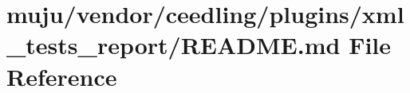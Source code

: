 \hypertarget{vendor_2ceedling_2plugins_2xml__tests__report_2_r_e_a_d_m_e_8md}{}\section{muju/vendor/ceedling/plugins/xml\+\_\+tests\+\_\+report/\+R\+E\+A\+D\+ME.md File Reference}
\label{vendor_2ceedling_2plugins_2xml__tests__report_2_r_e_a_d_m_e_8md}

